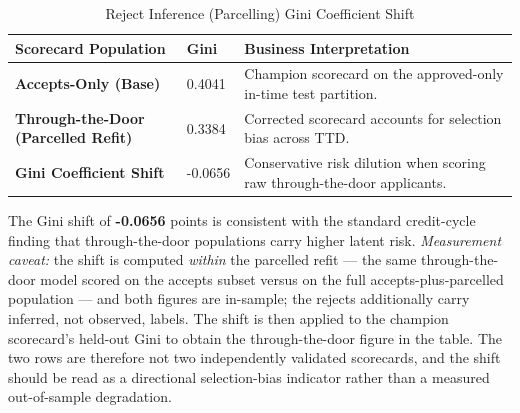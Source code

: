 \documentclass[11pt,a4paper]{article}
\begin{document}
\begin{table}[h]
    \centering
    \caption{Reject Inference (Parcelling) Gini Coefficient Shift}
    \label{tab:reject_inference}
    \vspace{0.5em}
    \begin{tabular}{llp{6cm}}
        \toprule
        \textbf{Scorecard Population} & \textbf{Gini} & \textbf{Business Interpretation} \\
        \midrule
        \textbf{Accepts-Only (Base)} & 0.4041 & Champion scorecard on the approved-only in-time test partition. \\
        \textbf{Through-the-Door (Parcelled Refit)} & 0.3384 & Corrected scorecard accounts for selection bias across TTD. \\
        \midrule
        \textbf{Gini Coefficient Shift} & -0.0656 & Conservative risk dilution when scoring raw through-the-door applicants. \\
        \bottomrule
    \end{tabular}
\end{table}

The Gini shift of \textbf{-0.0656} points is consistent with the standard credit-cycle finding that through-the-door populations carry higher latent risk. \emph{Measurement caveat:} the shift is computed \emph{within} the parcelled refit --- the same through-the-door model scored on the accepts subset versus on the full accepts-plus-parcelled population --- and both figures are in-sample; the rejects additionally carry inferred, not observed, labels. The shift is then applied to the champion scorecard's held-out Gini to obtain the through-the-door figure in the table. The two rows are therefore not two independently validated scorecards, and the shift should be read as a directional selection-bias indicator rather than a measured out-of-sample degradation.
\end{document}
